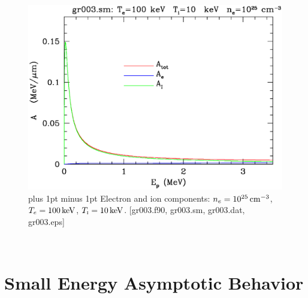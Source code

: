 \documentclass[preprint,12pt,eqsecnum,nofootinbib,amsmath,amssymb]{revtex4}
\newcommand{\smI}{{\rm\scriptscriptstyle I}}
\newcommand{\footnoteskip}{\baselineskip 12pt plus 1pt minus 1pt}
\begin{document}
\vskip-2cm 
\begin{figure}[h!]
\includegraphics[scale=0.45]{gr003.eps} 
\vskip-0.8cm 
\caption{\footnoteskip  
  Electron and ion components: $n_e=10^{25}\,{\rm cm^{-3}}$,
  $T_e=100\,{\rm keV}$, $T_\smI=10\,{\rm keV}$. [gr003.f90, gr003.sm,
  gr003.dat, gr003.eps] 
}
\label{fig:gr003}
\end{figure}
~~
\vfill
~~

\pagebreak
\section{Small Energy Asymptotic Behavior}
\end{document}
